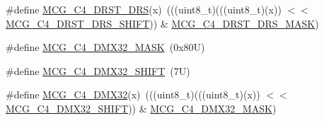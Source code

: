 \begin{DoxyCompactItemize}
\item 
\#define \mbox{\hyperlink{group___m_c_g___register___masks_gaf074d694a596e6e92614fd435c9ccb35}{M\+C\+G\+\_\+\+C4\+\_\+\+D\+R\+S\+T\+\_\+\+D\+RS}}(x)~(((uint8\+\_\+t)(((uint8\+\_\+t)(x)) $<$$<$ \mbox{\hyperlink{group___m_c_g___register___masks_ga27d4baa0c8a770f1f67ab47e6407e948}{M\+C\+G\+\_\+\+C4\+\_\+\+D\+R\+S\+T\+\_\+\+D\+R\+S\+\_\+\+S\+H\+I\+FT}})) \& \mbox{\hyperlink{group___m_c_g___register___masks_ga7f6629e8d17efb2cec3d2f63d09ede5a}{M\+C\+G\+\_\+\+C4\+\_\+\+D\+R\+S\+T\+\_\+\+D\+R\+S\+\_\+\+M\+A\+SK}})
\item 
\#define \mbox{\hyperlink{group___m_c_g___register___masks_ga5d16ac35cf87b3cdeeefca1c16a0eda0}{M\+C\+G\+\_\+\+C4\+\_\+\+D\+M\+X32\+\_\+\+M\+A\+SK}}~(0x80\+U)
\item 
\#define \mbox{\hyperlink{group___m_c_g___register___masks_ga12d73b2d4a4fd1f2fb21a1cbe87aaa83}{M\+C\+G\+\_\+\+C4\+\_\+\+D\+M\+X32\+\_\+\+S\+H\+I\+FT}}~(7\+U)
\item 
\#define \mbox{\hyperlink{group___m_c_g___register___masks_ga10fd0030b4d3fcb34503269a2a5796c0}{M\+C\+G\+\_\+\+C4\+\_\+\+D\+M\+X32}}(x)~(((uint8\+\_\+t)(((uint8\+\_\+t)(x)) $<$$<$ \mbox{\hyperlink{group___m_c_g___register___masks_ga12d73b2d4a4fd1f2fb21a1cbe87aaa83}{M\+C\+G\+\_\+\+C4\+\_\+\+D\+M\+X32\+\_\+\+S\+H\+I\+FT}})) \& \mbox{\hyperlink{group___m_c_g___register___masks_ga5d16ac35cf87b3cdeeefca1c16a0eda0}{M\+C\+G\+\_\+\+C4\+\_\+\+D\+M\+X32\+\_\+\+M\+A\+SK}})
\end{DoxyCompactItemize}
